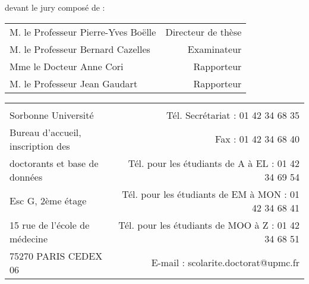 \documentclass[a4paper,12pt]{book}
\numberwithin{equation}{chapter}
\numberwithin{figure}{chapter}
\numberwithin{table}{chapter}
\begin{document}
\vspace*{.6cm} 
devant le jury composé de : 
\vspace*{.1cm} 
\begin{center}

\begin{tabular}{p{10cm} r}
  M. le Professeur Pierre-Yves Boëlle & Directeur de thèse\\
  M. le Professeur Bernard Cazelles & Examinateur  \\
  Mme le Docteur Anne Cori & Rapporteur  \\
  M. le Professeur Jean Gaudart & Rapporteur \\
\end{tabular}

\vspace{1cm}
{\footnotesize \begin{tabular}{p{6cm} r}
\hline \\[-1.5ex]
Sorbonne Université & Tél. Secrétariat : 01 42 34 68 35 \\
Bureau d’accueil, inscription des    & Fax : 01 42 34 68 40 \\
doctorants et base de données &Tél. pour les étudiants de A à EL : 01 42 34 69 54 \\
Esc G, 2ème étage &Tél. pour les étudiants de EM à MON : 01 42 34 68 41 \\
15 rue de l’école de médecine &Tél. pour les étudiants de MOO à Z : 01 42 34 68 51 \\
75270 PARIS CEDEX 06 & E-mail : scolarite.doctorat@upmc.fr \\
\end{tabular}}

\end{center}





\cleardoublepage

 

\tableofcontents

\listoffigures

\listoftables


\doublespacing
\mainmatter %










\end{document}
